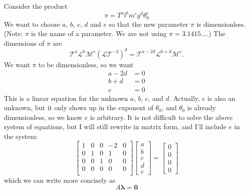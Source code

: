 \documentclass[reqno]{immbook}
\numberwithin{equation}{chapter}
\numberwithin{question}{section}
\numberwithin{theorem}{chapter}
\numberwithin{figure}{chapter}
\theoremstyle{definition}
\begin{document}
Consider the product
\begin{equation}
   \pi = T^a l^b m^c g^d \theta_0^e
\end{equation}
We want to choose $a$, $b$, $c$, $d$ and $e$ so that
the new parameter $\pi$ is dimensionless.
(Note: $\pi$ is the name of a parameter.
We are not using $\pi = 3.1415\ldots$.)
The dimensions of $\pi$ are
\begin{equation}
  \mathcal{T}^a \mathcal{L}^b \mathcal{M}^c
     \left(\mathcal{LT}^{-2}\right)^d
     = \mathcal{T}^{a-2d}\mathcal{L}^{b+d}\mathcal{M}^c.
\end{equation}
We want $\pi$ to be dimensionless, so we want
\begin{equation}
\begin{split}
  a-2d & = 0 \\
  {b+d} & = 0 \\
  c  & = 0
\end{split}
\end{equation}
This is a linear equation for the unknown $a$, $b$, $c$, and
$d$. Actually, $e$ is also an unknown, but it only shows
up in the exponent of $\theta_0$, and $\theta_0$ is 
already dimensionless, so we know $e$ is arbitrary.
It is not difficult to solve the above system of
equations, but I will still rewrite in matrix form, and
I'll include $e$ in the system:
\begin{equation}
   \begin{bmatrix}
       1 & 0 & 0 & -2 & 0 \\
       0 & 1 & 0 & 1  & 0 \\
       0 & 0 & 1 & 0  & 0 \\
       0 & 0 & 0 & 0 & 0  \\
   \end{bmatrix}
   \begin{bmatrix}
       a \\ b \\ c \\ d \\ e
   \end{bmatrix}
   =
   \begin{bmatrix}
       0 \\ 0 \\ 0 \\ 0
   \end{bmatrix}
   \label{eqn:linear}
\end{equation}
which we can write more concisely as
\begin{equation}
   A \pmb{\lambda} = \mathbf{0}
\end{equation}
\end{document}

